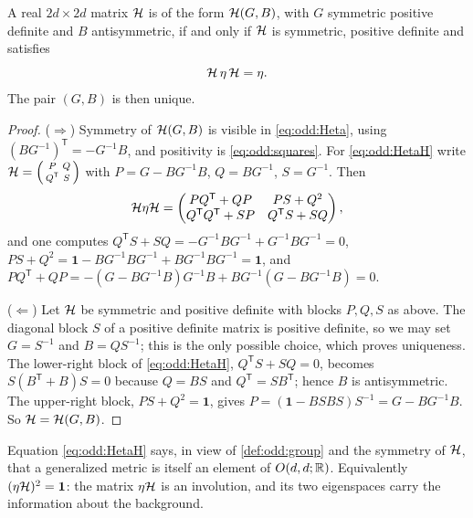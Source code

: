 \begin{lemma}\label{lem:odd:char}
A real $2d\times2d$ matrix $\mathcal{H}$ is of the form $\mathcal{H}(G,B)$, with $G$ symmetric positive
definite and $B$ antisymmetric, if and only if $\mathcal{H}$ is symmetric, positive definite and
satisfies
\begin{equation}\label{eq:odd:HetaH}
 \mathcal{H}\,\eta\,\mathcal{H}=\eta .
\end{equation}
The pair $(G,B)$ is then unique.
\end{lemma}
\begin{proof}
($\Rightarrow$) Symmetry of $\mathcal{H}(G,B)$ is visible in \eqref{eq:odd:Heta}, using
$(BG^{-1})^{\mathsf T}=-G^{-1}B$, and positivity is \eqref{eq:odd:squares}. For
\eqref{eq:odd:HetaH} write $\mathcal{H}=\left(\begin{smallmatrix}P&Q\\Q^{\mathsf T}&S
\end{smallmatrix}\right)$ with $P=G-BG^{-1}B$, $Q=BG^{-1}$, $S=G^{-1}$. Then
\begin{equation}\label{eq:odd:HetaHblocks}
 \mathcal{H}\eta\mathcal{H}=\begin{pmatrix}PQ^{\mathsf T}+QP&PS+Q^2\\ Q^{\mathsf T}Q^{\mathsf T}+SP&
 Q^{\mathsf T}S+SQ\end{pmatrix},
\end{equation}
and one computes $Q^{\mathsf T}S+SQ=-G^{-1}BG^{-1}+G^{-1}BG^{-1}=0$,
$PS+Q^2=\mathbf 1-BG^{-1}BG^{-1}+BG^{-1}BG^{-1}=\mathbf 1$, and
$PQ^{\mathsf T}+QP=-(G-BG^{-1}B)G^{-1}B+BG^{-1}(G-BG^{-1}B)=0$.

($\Leftarrow$) Let $\mathcal{H}$ be symmetric and positive definite with blocks $P,Q,S$ as above.
The diagonal block $S$ of a positive definite matrix is positive definite, so we may set
$G=S^{-1}$ and $B=QS^{-1}$; this is the only possible choice, which proves uniqueness. The
lower-right block of \eqref{eq:odd:HetaH}, $Q^{\mathsf T}S+SQ=0$, becomes
$S(B^{\mathsf T}+B)S=0$ because $Q=BS$ and $Q^{\mathsf T}=SB^{\mathsf T}$; hence $B$ is
antisymmetric. The upper-right block, $PS+Q^2=\mathbf 1$, gives
$P=(\mathbf 1-BSBS)S^{-1}=G-BG^{-1}B$. So $\mathcal{H}=\mathcal{H}(G,B)$.
\end{proof}

Equation \eqref{eq:odd:HetaH} says, in view of \cref{def:odd:group} and the symmetry of
$\mathcal{H}$, that a generalized metric is itself an element of $O(d,d;\mathbb{R})$. Equivalently
$(\eta\mathcal{H})^2=\mathbf 1$: the matrix $\eta\mathcal{H}$ is an involution, and its two eigenspaces
carry the information about the background.

